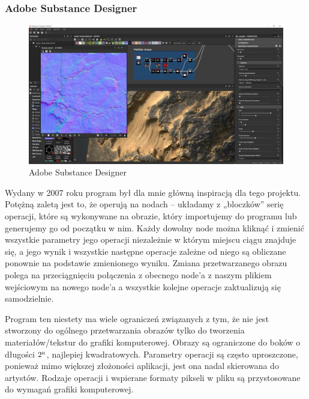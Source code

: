 \subsubsection{Adobe Substance Designer}
\begin{figure}[H]
    \centering
    \includegraphics{./images/Picture6.jpg}
    \caption{Adobe Substance Designer}
    \label{fig:designer}
\end{figure}
Wydany w 2007 roku program był dla mnie główną inspiracją dla tego projektu. Potężną zaletą jest to, że operują na nodach – układamy z „bloczków” serię operacji, które są wykonywane na obrazie, który importujemy do programu lub generujemy go od początku w nim. Każdy dowolny node można kliknąć i zmienić wszystkie parametry jego operacji niezależnie w którym miejscu ciągu znajduje się, a jego wynik i wszystkie następne operacje zależne od niego są obliczane ponownie na podstawie zmienionego wyniku. Zmiana przetwarzanego obrazu polega na przeciągnięciu połączenia z obecnego node’a z naszym plikiem wejściowym na nowego node’a a wszystkie kolejne operacje zaktualizują się samodzielnie.

Program ten niestety ma wiele ograniczeń związanych z tym, że nie jest stworzony do ogólnego przetwarzania obrazów tylko do tworzenia materiałów/tekstur do grafiki komputerowej. Obrazy są ograniczone do boków o długości $2\textsuperscript{n}$, najlepiej kwadratowych. Parametry operacji są często uproszczone, ponieważ mimo większej złożoności aplikacji, jest ona nadal skierowana do artystów. Rodzaje operacji i wspierane formaty pikseli w pliku są przystosowane do wymagań grafiki komputerowej.

